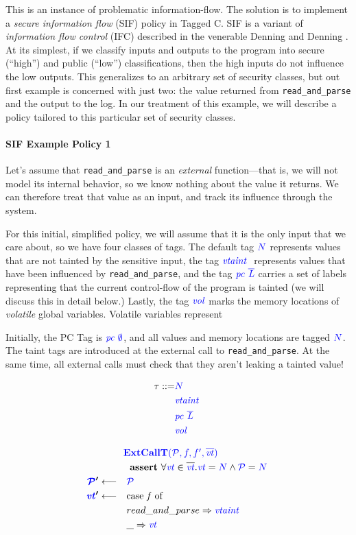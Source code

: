 \documentclass[acmsmall,review,anonymous]{acmart}\settopmatter{printfolios=true,printccs=false,printacmref=false}
\begin{document}
This is an instance of problematic information-flow. The solution is to implement
a {\em secure information flow} (SIF) policy in Tagged C. SIF is a variant of
{\em information flow control} (IFC) described in the venerable Denning and Denning
\cite{Denning77:SecureInformationFlow}. At its simplest, if we classify inputs and outputs to
the program into secure (``high'') and public (``low'') classifications, then the
high inputs do not influence the low outputs. This generalizes to an arbitrary set
of security classes, but out first example is concerned with just two: the value
returned from {\tt read\_and\_parse} and the output to the log.
In our treatment of this example, we will describe a policy tailored to this particular
set of security classes.

\paragraph*{SIF Example Policy 1}

Let's assume that {\tt read\_and\_parse} is an {\em external} function---that is, we will not
model its internal behavior, so we know nothing about the value it returns. We can therefore
treat that value as an input, and track its influence through the system.

For this initial, simplified policy, we will assume that it is the only input that we care about,
so we have four classes of tags. The default tag \({\color{blue} N}\) represents values that are not tainted
by the sensitive input, the tag \(\mathit{\color{blue} vtaint ~ }\) represents values that have been influenced by
{\tt read\_and\_parse}, and the tag \(\mathit{\color{blue} pc ~ \overline{L}}\) carries a set of labels
representing that the current control-flow of the program is tainted (we will discuss this in detail
below.) Lastly, the tag \(\mathit{\color{blue} vol}\) marks the memory locations of {\em volatile} global variables.
Volatile variables represent 

Initially, the PC Tag is \(\mathit{\color{blue} pc ~ \emptyset}\), and all values and memory locations are
tagged \({\color{blue} N}\). The taint tags are introduced at the external call to {\tt read\_and\_parse}.
At the same time, all external calls must check that they aren't leaking a tainted value!

\begin{minipage}{0.25\textwidth}
{ \color{blue}
  \begin{align*}
    \tau ::= & {\color{blue} N} \\
    & \mathit{\color{blue} vtaint ~ } \\
    & \mathit{\color{blue} pc ~ \overline{L}} \\
    & \mathit{\color{blue} vol} \\
\end{align*} }
\end{minipage}
\begin{minipage}{0.74\textwidth}
\[\begin{aligned}
\truledef{\extcallt}
\assert{\forall \vt \in \overline{\vt} . \vt = \N \land \PCT = \N}
\settag{\PCT'}{\PCT}
\settag{\vt'}{\caseof{f}}
\caseentry{read\_and\_parse}{\vtaint{}} \\
\caseentry{\_}{\vt} \\
\end{aligned}\]
\end{minipage}
\end{document}
